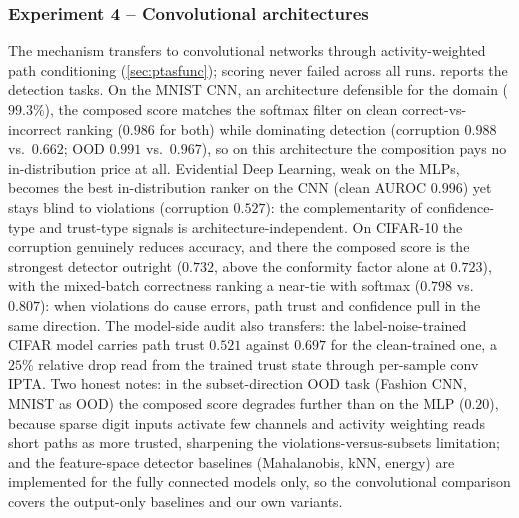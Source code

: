 \subsubsection*{Experiment 4 -- Convolutional architectures}
The mechanism transfers to convolutional networks through activity-weighted path conditioning (\cref{sec:ptasfunc}); scoring never failed across all runs.  reports the detection tasks. On the MNIST CNN, an architecture defensible for the domain ($99.3\%$), the composed score matches the softmax filter on clean correct-vs-incorrect ranking ($0.986$ for both) while dominating detection (corruption $0.988$ vs.\ $0.662$; OOD $0.991$ vs.\ $0.967$), so on this architecture the composition pays no in-distribution price at all. Evidential Deep Learning, weak on the MLPs, becomes the best in-distribution ranker on the CNN (clean AUROC $0.996$) yet stays blind to violations (corruption $0.527$): the complementarity of confidence-type and trust-type signals is architecture-independent. On CIFAR-10 the corruption genuinely reduces accuracy, and there the composed score is the strongest detector outright ($0.732$, above the conformity factor alone at $0.723$), with the mixed-batch correctness ranking a near-tie with softmax ($0.798$ vs.\ $0.807$): when violations do cause errors, path trust and confidence pull in the same direction. The model-side audit also transfers: the label-noise-trained CIFAR model carries path trust $0.521$ against $0.697$ for the clean-trained one, a $25\%$ relative drop read from the trained trust state through per-sample conv IPTA. Two honest notes: in the subset-direction OOD task (Fashion CNN, MNIST as OOD) the composed score degrades further than on the MLP ($0.20$), because sparse digit inputs activate few channels and activity weighting reads short paths as more trusted, sharpening the violations-versus-subsets limitation; and the feature-space detector baselines (Mahalanobis, kNN, energy) are implemented for the fully connected models only, so the convolutional comparison covers the output-only baselines and our own variants.

